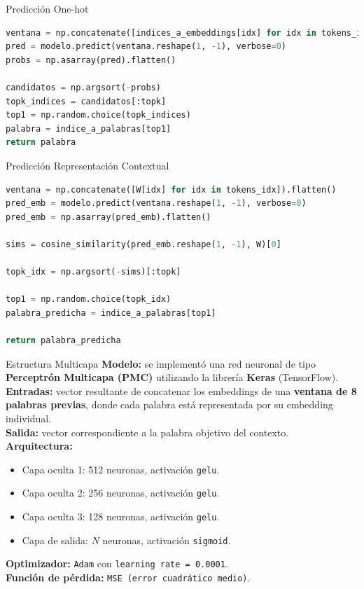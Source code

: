 \documentclass{beamer}
\begin{document}
\begin{frame}[fragile]{Predicción One-hot}
	\begin{lstlisting}[language=Python]
ventana = np.concatenate([indices_a_embeddings[idx] for idx in tokens_idx]).flatten()
pred = modelo.predict(ventana.reshape(1, -1), verbose=0)
probs = np.asarray(pred).flatten()

candidatos = np.argsort(-probs)
topk_indices = candidatos[:topk]
top1 = np.random.choice(topk_indices)
palabra = indice_a_palabras[top1]
return palabra
	\end{lstlisting}
\end{frame}

\begin{frame}[fragile]{Predicción Representación Contextual}
	\begin{lstlisting}[language=Python]
ventana = np.concatenate([W[idx] for idx in tokens_idx]).flatten()
pred_emb = modelo.predict(ventana.reshape(1, -1), verbose=0)
pred_emb = np.asarray(pred_emb).flatten()

sims = cosine_similarity(pred_emb.reshape(1, -1), W)[0]

topk_idx = np.argsort(-sims)[:topk]

top1 = np.random.choice(topk_idx)
palabra_predicha = indice_a_palabras[top1]

return palabra_predicha
	\end{lstlisting}
\end{frame}
	
\begin{frame}{Estructura Multicapa}
	\small
	\textbf{Modelo:} se implementó una red neuronal de tipo \textbf{Perceptrón Multicapa (PMC)} utilizando la librería \textbf{Keras} (TensorFlow).\\[0.4em]
	
	\textbf{Entradas:} vector resultante de concatenar los embeddings de una \textbf{ventana de 8 palabras previas}, donde cada palabra está representada por su embedding individual.\\[0.4em]

	\textbf{Salida:} vector correspondiente a la palabra objetivo del contexto.\\[0.4em]
	
	\textbf{Arquitectura:}
	\begin{itemize}
		\item Capa oculta 1: 512 neuronas, activación \texttt{gelu}.
		\item Capa oculta 2: 256 neuronas, activación \texttt{gelu}.
		\item Capa oculta 3: 128 neuronas, activación \texttt{gelu}.
		\item Capa de salida: $N$ neuronas, activación \texttt{sigmoid}.
	\end{itemize}
	
	\textbf{Optimizador:} \texttt{Adam} con \texttt{learning rate = 0.0001}.\\
	\textbf{Función de pérdida:} \texttt{MSE (error cuadrático medio)}.
\end{frame}
\end{document}
